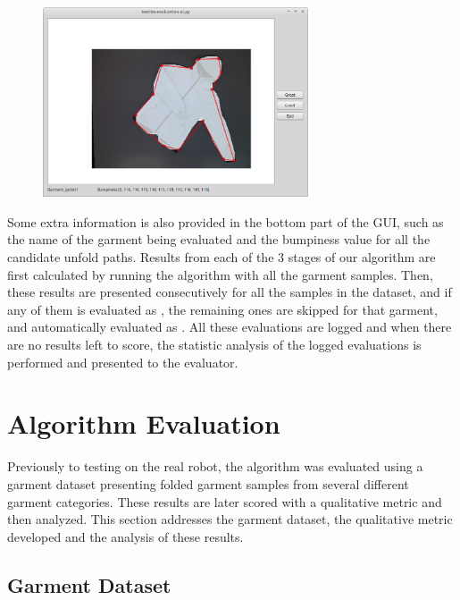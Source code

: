 \begin{figure}[thpb]
    \centering
    \includegraphics[width=0.7\textwidth]
    {figures/evaluation-gui.png}
    \caption[]
    {}
    \label{fig:gui}
\end{figure}


Some extra information is also provided in the bottom part of the GUI, such as the name of the garment being evaluated and the bumpiness value for all the candidate unfold paths. Results from each of the 3 stages of our algorithm are first calculated by running the algorithm with all the garment samples. Then, these results are presented consecutively for all the samples in the dataset, and if any of them is evaluated as \fail{}, the remaining ones are skipped for that garment, and automatically evaluated as \discarded{}. All these evaluations are logged and when there are no results left to score, the statistic analysis of the logged evaluations is performed and presented to the evaluator. 

\section{Algorithm Evaluation}
\label{experiments:evaluation}

Previously to testing on the real robot, the algorithm was evaluated using a garment dataset presenting folded garment samples from several different garment categories. These results are later scored with a qualitative metric and then analyzed. This section addresses the garment dataset, the qualitative metric developed and the analysis of these results.

\subsection{Garment Dataset}
\label{experiments:dataset}

